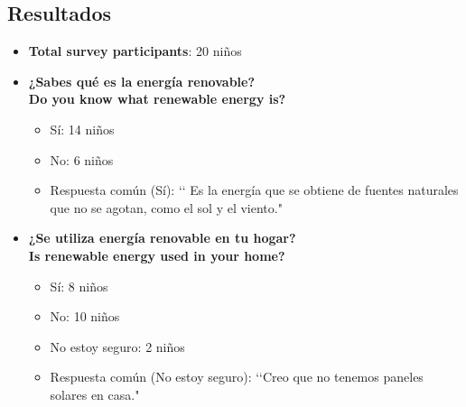 \documentclass[12pt]{article}
\begin{document}
\subsection{Resultados}
\begin{itemize}
      \item
            \textbf{Total survey participants}: 20 niños

      \item \textbf{¿Sabes qué es la energía renovable?}\\
            \textbf{Do you know what renewable energy is?}
            \begin{itemize}
                  \item Sí: 14 niños
                  \item No: 6 niños
                  \item Respuesta común (Sí): \lq\lq
                        Es la energía que se obtiene de fuentes naturales que no se agotan, como el sol y el viento."
            \end{itemize}
            \begin{minipage}{\linewidth}
                  \centering
                  \begin{minipage}{0.5\linewidth}
                  \end{minipage}%
            \end{minipage}

      \item \textbf{¿Se utiliza energía renovable en tu hogar?}\\
            \textbf{Is renewable energy used in your home?}
            \begin{itemize}
                  \item Sí: 8 niños
                  \item No: 10 niños
                  \item No estoy seguro: 2 niños
                  \item Respuesta común (No estoy seguro): \lq\lq Creo que no tenemos paneles solares en casa."
            \end{itemize}
            \begin{minipage}{\linewidth}
                  \centering
                  \begin{minipage}{0.5\linewidth}
                  \end{minipage}%
            \end{minipage}


\end{itemize}
\end{document}
